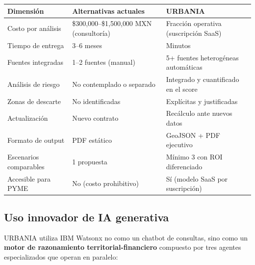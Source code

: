 \documentclass[12pt,a4paper]{article}
\begin{document}
\begin{table}[H]
\centering
\small
\renewcommand{\arraystretch}{1.3}
\begin{tabularx}{\textwidth}{X X X}
\toprule
\rowcolor{grisoscuro}
\color{white}\textbf{Dimensión} & \color{white}\textbf{Alternativas actuales} & \color{white}\textbf{URBANIA} \\
\midrule
Costo por análisis & \$300{,}000–\$1{,}500{,}000 MXN (consultoría) & Fracción operativa (suscripción SaaS) \\
\rowcolor{fondofila}
Tiempo de entrega & 3–6 meses & Minutos \\
Fuentes integradas & 1–2 fuentes (manual) & 5+ fuentes heterogéneas automáticas \\
\rowcolor{fondofila}
Análisis de riesgo & No contemplado o separado & Integrado y cuantificado en el score \\
Zonas de descarte & No identificadas & Explícitas y justificadas \\
\rowcolor{fondofila}
Actualización & Nuevo contrato & Recálculo ante nuevos datos \\
Formato de output & PDF estático & GeoJSON + PDF ejecutivo \\
\rowcolor{fondofila}
Escenarios comparables & 1 propuesta & Mínimo 3 con ROI diferenciado \\
Accesible para PYME & No (costo prohibitivo) & Sí (modelo SaaS por suscripción) \\
\bottomrule
\end{tabularx}
\end{table}

\subsection{Uso innovador de IA generativa}

URBANIA utiliza IBM Watsonx no como un chatbot de consultas, sino como un \textbf{motor de razonamiento territorial-financiero} compuesto por tres agentes especializados que operan en paralelo:
\end{document}
